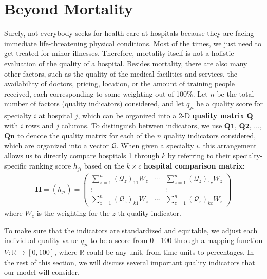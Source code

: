 \documentclass{article}
\begin{document}
\section{Beyond Mortality}
Surely, not everybody seeks for health care at hospitals because they are facing immediate life-threatening physical conditions. Most of the times, we just need to get treated for minor illnesses. Therefore, mortality itself is not a holistic evaluation of the quality of a hospital. Besides mortality, there are also many other factors, such as the quality of the medical facilities and services, the availability of doctors, pricing, location, or the amount of training people received, each corresponding to some weighting out of 100\%. Let $n$ be the total number of factors (quality indicators) considered, and let $q_{ji}$ be a quality score for specialty $i$ at hospital $j$, which can be organized into a 2-D \textbf{quality matrix} $\mathbf{Q}$ with $i$ rows and $j$ columns. To distinguish between indicators, we use $\mathbf{Q1}$, $\mathbf{Q2}$, $\dots$, $\mathbf{Qn}$ to denote the quality matrix for each of the $n$ quality indicators considered, which are organized into a vector $\mathcal{Q}$. When given a specialty $i$, this arrangement allows us to directly compare hospitals 1 through $k$ by referring to their specialty-specific ranking score $h_{ji}$ based on the $k \times c$ \textbf{hospital comparison matrix}:
\begin{gather}\label{eq:hospital_comparison}
    \textbf{H} = (h_{ji}) =
    \begin{pmatrix}
    \sum_{z=1}^{n} (\mathcal{Q}_z)_{11} W_z & \cdots & \sum_{z=1}^{n} (\mathcal{Q}_z)_{1c}W_z \\
    \vdots & & \vdots \\
    \sum_{z=1}^{n} (\mathcal{Q}_z)_{k1}W_z & \cdots & \sum_{z=1}^{n} (\mathcal{Q}_z)_{kc} W_z
    \end{pmatrix}
\end{gather}
where $W_z$ is the weighting for the $z$-th quality indicator.

To make sure that the indicators are standardized and equitable, we adjust each individual quality value $q_{ji}$ to be a score from 0 - 100 through a mapping function $V : \mathbb{R} \to [0,100]$, where $\mathbb{R}$ could be any unit, from time units to percentages. In the rest of this section, we will discuss several important quality indicators that our model will consider.
\end{document}
